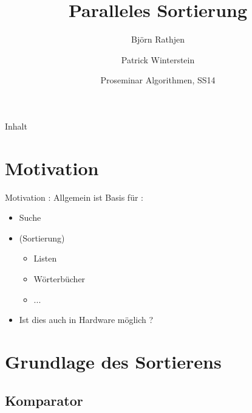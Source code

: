 \documentclass[ucs,9pt]{beamer}
\title[Para Sort] %
{Paralleles Sortierung}
\author[] %
{Björn Rathjen \and Patrick Winterstein}
\institute[FU Berlin] %
{Freie Universität Berlin}
\date[ProSem Algo]
{Proseminar Algorithmen, SS14}
\begin{document}
\begin{frame}[plain]
  \titlepage
\end{frame}
 
\begin{frame}{Inhalt}
\end{frame}


\section{Motivation}

\begin{frame}{Motivation : Allgemein}
    ist Basis für :
    \begin{itemize}
        \item Suche
        \item (Sortierung)
        \begin{itemize}
            \item Listen
            \item Wörterbücher
            \item ... 
        \end{itemize}
        \item Ist dies auch in Hardware möglich ?
    \end{itemize}
\end{frame}

\section{Grundlage des Sortierens}
\subsection{Komparator}
\end{document}
